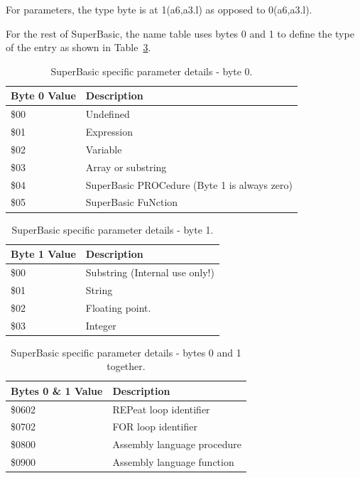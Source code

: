 For parameters, the type byte is at 1(a6,a3.l) as opposed
    to 0(a6,a3.l).

For the rest of SuperBasic, the name table uses bytes 0 and 1 to
    define the type of the entry as shown in  Table~\ref{tab:SuperBasicParameterDetailsByte0And1}.

\begin{table}[htbp]
\centering
\begin{tabular}{l l}  %
\toprule
\textbf{Byte 0 Value} & \textbf{Description} \\
\midrule
%
\$00 & Undefined\\
\$01 & Expression\\
\$02 & Variable\\
\$03 & Array or substring\\
\$04 & SuperBasic PROCedure (Byte 1 is always zero)\\
\$05 & SuperBasic FuNction\\
%
\bottomrule
\end{tabular}
\caption{SuperBasic specific parameter details -{} byte 0.}
\label{tab:SuperBasicParameterDetailsByte0}
\end{table}

\begin{table}[htbp]
\centering
\begin{tabular}{l l}  %
\toprule
\textbf{Byte 1 Value} & \textbf{Description} \\
\midrule
%
\$00 & Substring (Internal use only!)\\
\$01 & String\\
\$02 & Floating point.\\
\$03 & Integer\\
%
\bottomrule
\end{tabular}
\caption{SuperBasic specific parameter details -{} byte 1.}
\label{tab:SuperBasicParameterDetailsByte1}
\end{table}

\begin{table}[htbp]
\centering
\begin{tabular}{l l}  %
\toprule
\textbf{Bytes 0 \& 1 Value} & \textbf{Description} \\
\midrule
%
\$0602 & REPeat loop identifier\\
\$0702 & FOR loop identifier\\
\$0800 & Assembly language procedure\\
\$0900 & Assembly language function\\
%
\bottomrule
\end{tabular}
\caption{SuperBasic specific parameter details -{} bytes 0 and 1 together.}
\label{tab:SuperBasicParameterDetailsByte0And1}
\end{table}


